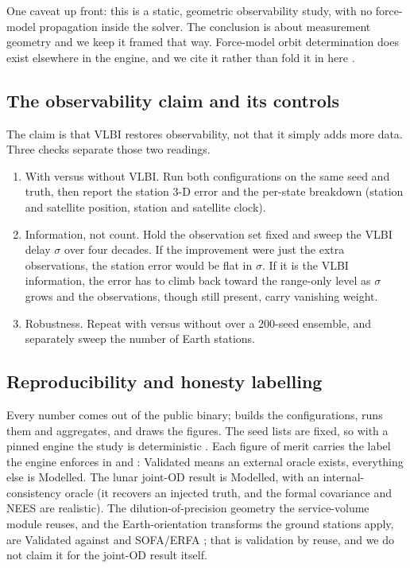 One caveat up front: this is a static, geometric observability study, with no
force-model propagation inside the solver. The conclusion is about measurement
geometry and we keep it framed that way. Force-model orbit determination does
exist elsewhere in the engine, and we cite it rather than fold it in here
\citep{lemoine2013grail,bertone2021grail,li2023leopod}.

\subsection{The observability claim and its controls}

The claim is that VLBI restores observability, not that it simply adds more
data. Three checks separate those two readings.

\begin{enumerate}
  \item With versus without VLBI. Run both configurations on the same seed and
    truth, then report the station 3-D error and the per-state breakdown
    (station and satellite position, station and satellite clock).
  \item Information, not count. Hold the observation set fixed and sweep the VLBI
    delay $\sigma$ over four decades. If the improvement were just the extra
    observations, the station error would be flat in $\sigma$. If it is the VLBI
    information, the error has to climb back toward the range-only level as
    $\sigma$ grows and the observations, though still present, carry vanishing
    weight.
  \item Robustness. Repeat with versus without over a 200-seed ensemble, and
    separately sweep the number of Earth stations.
\end{enumerate}

\subsection{Reproducibility and honesty labelling}

Every number comes out of the public  binary;
 builds the configurations, runs them and
aggregates, and  draws the figures. The seed lists
are fixed, so with a pinned engine the study is deterministic
\citep{fernandezprades2018reproducibility}. Each figure of merit carries the
label the engine enforces in  and
: Validated means an external oracle exists,
everything else is Modelled. The lunar joint-OD result is Modelled, with an
internal-consistency oracle (it recovers an injected truth, and the formal
covariance and NEES are realistic). The dilution-of-precision geometry the
service-volume module reuses, and the Earth-orientation transforms the ground
stations apply, are Validated against 
\citep{knowles2024gnsslibpy} and SOFA/ERFA \citep{iausofa}; that is validation by
reuse, and we do not claim it for the joint-OD result itself.
